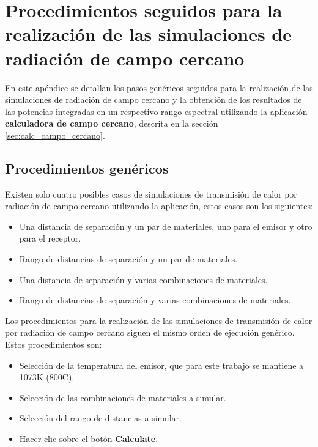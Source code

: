 \chapter[Procedimientos simulaciones radiación]{Procedimientos seguidos para la realización de las simulaciones de radiación de campo cercano}\label{ch:procedimientosSimRad}

En este apéndice se detallan los pasos genéricos seguidos para la realización de las simulaciones de radiación de campo cercano y la obtención de los resultados de las potencias integradas en un respectivo rango espectral utilizando la aplicación \textbf{calculadora de campo cercano}, descrita en la sección \ref{sec:calc_campo_cercano}.

\section{Procedimientos genéricos}
Existen solo cuatro posibles casos de simulaciones de transmisión de calor por radiación de campo cercano utilizando la aplicación, estos casos son los siguientes:
\begin{itemize}
	\item Una distancia de separación y un par de materiales, uno para el emisor y otro para el receptor.
	\item Rango de distancias de separación y un par de materiales.
	\item Una distancia de separación y varias combinaciones de materiales.
	\item Rango de distancias de separación y varias combinaciones de materiales.
\end{itemize}
Los procedimientos para la realización de las simulaciones de transmisión de calor por radiación de campo cercano siguen el mismo orden de ejecución genérico. Estos procedimientos son:
\begin{itemize}
	\item Selección de la temperatura del emisor, que para este trabajo se mantiene a 1073K (800\textdegree C).
	\item Selección de las combinaciones de materiales a simular.
	\item Selección del rango de distancias a simular.
	\item Hacer clic sobre el botón \textbf{Calculate}.
\end{itemize}
